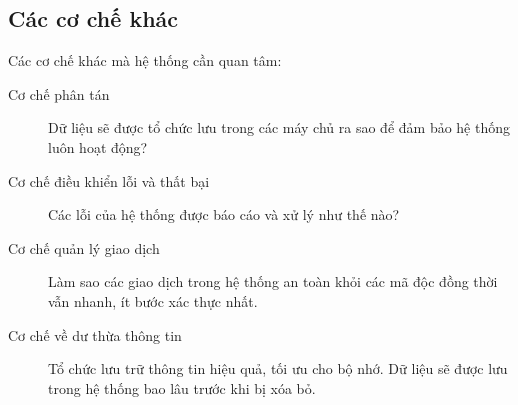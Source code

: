 \documentclass[./../main_file.tex]{subfiles}
\begin{document}
	\subsection{Các cơ chế khác}
	Các cơ chế khác mà hệ thống cần quan tâm:
	\begin{description}
		\item[Cơ chế phân tán] Dữ liệu sẽ được tổ chức lưu trong các máy chủ ra sao để đảm bảo hệ thống luôn hoạt động?
		\item[Cơ chế điều khiển lỗi và thất bại] Các lỗi của hệ thống được báo cáo và xử lý như thế nào?
		\item[Cơ chế quản lý giao dịch] Làm sao các giao dịch trong hệ thống an toàn khỏi các mã độc đồng thời vẫn nhanh, ít bước xác thực nhất. 
		\item[Cơ chế về dư thừa thông tin] Tổ chức lưu trữ thông tin hiệu quả, tối ưu cho bộ nhớ. Dữ liệu sẽ được lưu trong hệ thống bao lâu trước khi bị xóa bỏ.
	\end{description}
	
	
\end{document}
